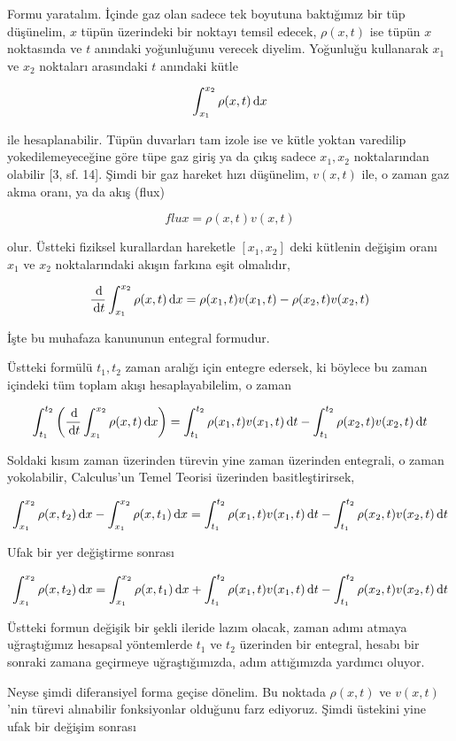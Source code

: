 \documentclass[12pt,fleqn]{article}\usepackage{../../common}
\begin{document}
Formu yaratalım. İçinde gaz olan sadece tek boyutuna baktığımız bir tüp
düşünelim, $x$ tüpün üzerindeki bir noktayı temsil edecek, $\rho(x,t)$ ise tüpün
$x$ noktasında ve $t$ anındaki yoğunluğunu verecek diyelim. Yoğunluğu kullanarak
$x_1$ ve $x_2$ noktaları arasındaki $t$ anındaki kütle

$$
\int _{x_1}^{x_2} \rho(x,t) \,\mathrm{d} x
$$

ile hesaplanabilir. Tüpün duvarları tam izole ise ve kütle yoktan varedilip
yokedilemeyeceğine göre tüpe gaz giriş ya da çıkış sadece $x_1,x_2$
noktalarından olabilir [3, sf. 14]. Şimdi bir gaz hareket hızı düşünelim,
$v(x,t)$ ile, o zaman gaz akma oranı, ya da akış (flux)

$$
flux = \rho(x,t) v(x,t)
$$

olur. Üstteki fiziksel kurallardan hareketle $[x_1,x_2]$ deki kütlenin
değişim oranı $x_1$ ve $x_2$ noktalarındaki akışın farkına eşit olmalıdır,

$$
\frac{\,\mathrm{d}}{\,\mathrm{d} t} \int _{x_1}^{x_2} \rho(x,t) \,\mathrm{d} x =
\rho(x_1,t) v(x_1,t) - \rho(x_2,t) v(x_2,t)
$$

İşte bu muhafaza kanununun entegral formudur. 

Üstteki formülü $t_1,t_2$ zaman aralığı için entegre edersek, ki böylece
bu zaman içindeki tüm toplam akışı hesaplayabilelim, o zaman

$$
\int_{t_1}^{t_2} \left( \frac{\,\mathrm{d}}{\,\mathrm{d} t} \int _{x_1}^{x_2} \rho(x,t) \,\mathrm{d} x  \right)  =
\int_{t_1}^{t_2} \rho(x_1,t) v(x_1,t) \,\mathrm{d} t -
\int_{t_1}^{t_2} \rho(x_2,t) v(x_2,t) \,\mathrm{d} t
$$

Soldaki kısım zaman üzerinden türevin yine zaman üzerinden entegrali, o zaman
yokolabilir, Calculus'un Temel Teorisi üzerinden basitleştirirsek,

$$
\int _{x_1}^{x_2} \rho(x,t_2) \,\mathrm{d} x -
\int _{x_1}^{x_2} \rho(x,t_1) \,\mathrm{d} x  = 
\int_{t_1}^{t_2} \rho(x_1,t) v(x_1,t) \,\mathrm{d} t -
\int_{t_1}^{t_2}  \rho(x_2,t) v(x_2,t) \,\mathrm{d} t
$$

Ufak bir yer değiştirme sonrası

$$
\int _{x_1}^{x_2} \rho(x,t_2) \,\mathrm{d} x =
\int _{x_1}^{x_2} \rho(x,t_1) \,\mathrm{d} x  +
\int_{t_1}^{t_2} \rho(x_1,t) v(x_1,t) \,\mathrm{d} t -
\int_{t_1}^{t_2}  \rho(x_2,t) v(x_2,t) \,\mathrm{d} t
$$

Üstteki formun değişik bir şekli ileride lazım olacak, zaman adımı atmaya
uğraştığımız hesapsal yöntemlerde $t_1$ ve $t_2$ üzerinden bir entegral, hesabı
bir sonraki zamana geçirmeye uğraştığımızda, adım attığımızda yardımcı oluyor.

Neyse şimdi diferansiyel forma geçise dönelim. Bu noktada $\rho(x,t)$ ve
$v(x,t)$'nin türevi alınabilir fonksiyonlar olduğunu farz ediyoruz. Şimdi
üstekini yine ufak bir değişim sonrası
\end{document}
